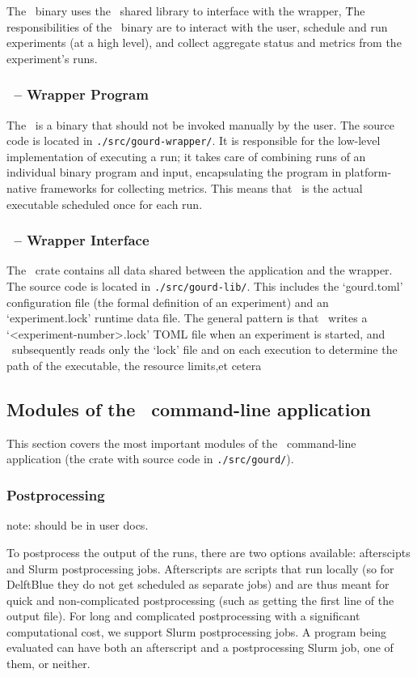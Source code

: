 The \gourd\ binary uses the \gourdlib\ shared library to interface with
the wrapper, \gourdwrap\.
The responsibilities of the \gourd\ binary are to interact with the user,
schedule and run experiments (at a high level), and collect aggregate
status and metrics from the experiment's runs.

\subsubsection{\gourdwrap\ -- Wrapper Program}

The \gourdwrap\ is a binary that should not be invoked manually by the user.
The source code is located in \verb|./src/gourd-wrapper/|.
It is responsible for the low-level implementation of executing a run;
it takes care of combining runs of an individual binary program and input,
encapsulating the program in platform-native frameworks for collecting metrics.
This means that \gourdwrap\ is the actual executable scheduled once for each run.

\subsubsection{\gourdlib\ -- Wrapper Interface}

The \gourdlib\ crate contains all data shared between the application and the wrapper.
The source code is located in \verb|./src/gourd-lib/|.
This includes the `gourd.toml' configuration file (the formal definition of an experiment)
and an `experiment.lock' runtime data file.
The general pattern is that \gourd\ writes a `<experiment-number>.lock' TOML file when
an experiment is started, and \gourdwrap\ subsequently reads only the `lock' file and
on each execution to determine the path of the executable, the resource limits,et cetera


\subsection{Modules of the \gourd\ command-line application}

This section covers the most important modules of the \gourd\ command-line application
(the crate with source code in \verb|./src/gourd/|).


\subsubsection{Postprocessing}
note: should be in user docs.

To postprocess the output of the runs, there are two options available: afterscipts and Slurm postprocessing jobs.
Afterscripts are scripts that run locally (so for DelftBlue they do not get scheduled as separate jobs) and are
thus meant for quick and non-complicated postprocessing (such as getting the first line of the output file). For
long and complicated postprocessing with a significant computational cost, we support Slurm postprocessing jobs.
A program being evaluated can have both an afterscript and a postprocessing Slurm job, one of them, or neither.

